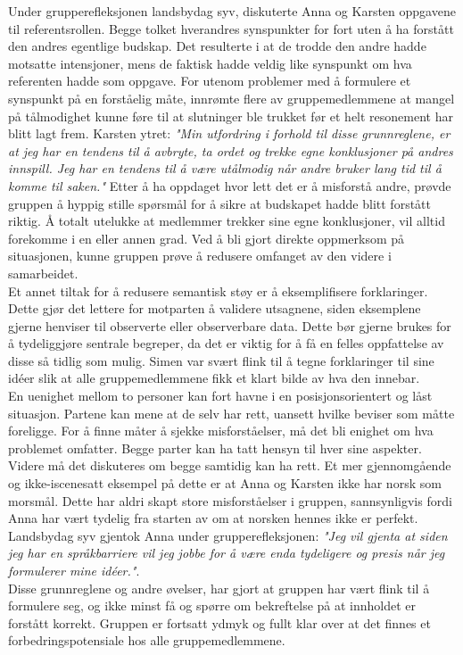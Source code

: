 Under grupperefleksjonen landsbydag syv, diskuterte Anna og Karsten oppgavene til referentsrollen. Begge tolket hverandres synspunkter for fort uten å ha forstått den andres egentlige budskap. Det resulterte i at de trodde den andre hadde motsatte intensjoner, mens de faktisk hadde veldig like synspunkt om hva referenten hadde som oppgave. 
For utenom problemer med å formulere et synspunkt på en forståelig måte, innrømte flere av gruppemedlemmene at mangel på tålmodighet kunne føre til at slutninger ble trukket før et helt resonement har blitt lagt frem. 
Karsten ytret: \emph{"Min utfordring i forhold til disse grunnreglene, er at jeg har en tendens til å avbryte, ta ordet og trekke egne konklusjoner på andres innspill. Jeg har en tendens til å være utålmodig når andre bruker lang tid til å komme til saken."}
Etter å ha oppdaget hvor lett det er å misforstå andre, prøvde gruppen å hyppig stille spørsmål for å sikre at budskapet hadde blitt forstått riktig. Å totalt utelukke at medlemmer trekker sine egne konklusjoner, vil alltid forekomme i en eller annen grad. Ved å bli gjort direkte oppmerksom på situasjonen, kunne gruppen prøve å redusere omfanget av den videre i samarbeidet. \\

Et annet tiltak for å redusere semantisk støy er å eksemplifisere forklaringer. Dette gjør det lettere for motparten å validere utsagnene, siden eksemplene gjerne henviser til observerte eller observerbare data.
Dette bør gjerne brukes for å tydeliggjøre sentrale begreper, da det er viktig for å få en felles oppfattelse av disse så tidlig som mulig. Simen var svært flink til å tegne forklaringer til sine idéer slik at alle gruppemedlemmene fikk et klart bilde av hva den innebar. \\

En uenighet mellom to personer kan fort havne i en posisjonsorientert og låst situasjon.
Partene kan mene at de selv har rett, uansett hvilke beviser som måtte foreligge.
For å finne måter å sjekke misforståelser, må det bli enighet om hva problemet omfatter. Begge parter kan ha tatt hensyn til hver sine aspekter.
Videre må det diskuteres om begge samtidig kan ha rett.
Et mer gjennomgående og ikke-iscenesatt eksempel på dette er at Anna og Karsten ikke har norsk som morsmål.
Dette har aldri skapt store misforståelser i gruppen, sannsynligvis fordi Anna har vært tydelig fra starten av om at norsken hennes ikke er perfekt. Landsbydag syv gjentok Anna under grupperefleksjonen: \emph{"Jeg vil gjenta at siden jeg har en språkbarriere vil jeg jobbe for å være enda tydeligere og presis når jeg formulerer mine idéer."}. \\

Disse grunnreglene og andre øvelser, har gjort at gruppen har vært flink til å formulere seg, og ikke minst få og spørre om bekreftelse på at innholdet er forstått korrekt. Gruppen er fortsatt ydmyk og fullt klar over at det finnes et forbedringspotensiale hos alle gruppemedlemmene. \\
